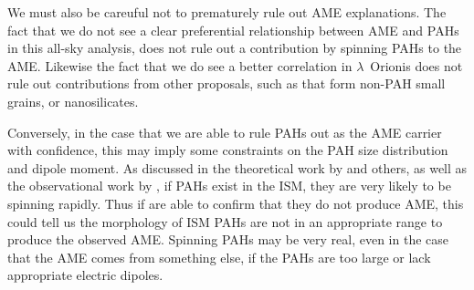                 We must also be careuful not to prematurely rule out AME explanations. The fact that we do not see a clear preferential relationship between AME and PAHs in this all-sky analysis, does not rule out a contribution by spinning PAHs to the AME. Likewise the fact that we do see a better correlation in $\lambda$~Orionis does not rule out contributions from other proposals, such as that form non-PAH small grains, or nanosilicates.

                Conversely, in the case that we are able to rule PAHs out as the AME carrier with confidence, this may imply some constraints on the PAH size distribution and dipole moment. As discussed in the theoretical work by \cite{draine98, ali-haimoud10} and others, as well as the observational work by \cite{hensley16}, if PAHs exist in the ISM, they are very likely to be spinning rapidly. Thus if are able to confirm that they do not produce AME, this could tell us the morphology of ISM PAHs are not in an appropriate range to produce the observed AME. Spinning PAHs may be very real, even in the case that the AME comes from something else, if the PAHs are too large or lack appropriate electric dipoles.
